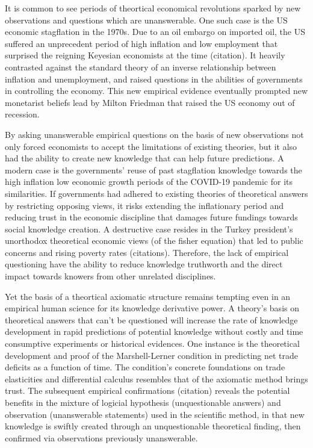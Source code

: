 \documentclass[a4paper,12pt]{article}
\begin{document}
It is common to see periods of theortical economical revolutions sparked by new observations and questions which are unanswerable. One such case is the US economic stagflation in the 1970s. Due to an oil embargo on imported oil, the US suffered an unprecedent period of high inflation and low employment that surprised the reigning Keyesian economists at the time (citation). It heavily contrasted against the standard theory of an inverse relationship between inflation and unemployment, and raised questions in the abilities of governments in controlling the economy. This new empirical evidence eventually prompted new monetarist beliefs lead by Milton Friedman that raised the US economy out of recession.

By asking unanswerable empirical questions on the basis of new observations not only forced economists to 
accept the limitations of existing theories, but it also had the ability to create new knowledge that can help future predictions. A modern case is the governments' reuse of past stagflation knowledge towards the high inflation low economic growth periods of the COVID-19 pandemic for its similarities. If governments had adhered to existing theories of theoretical answers by restricting opposing views, it risks extending the inflationary period and reducing trust in the economic discipline that damages future fundings towards social knowledge creation. A destructive case resides in the Turkey president's unorthodox theoretical economic views (of the fisher equation) that led to public concerns and rising poverty rates (citations). Therefore, the lack of empirical questioning have the ability to reduce knowledge truthworth and the direct impact towards knowers from other unrelated disciplines.

Yet the basis of a theortical axiomatic structure remains tempting even in an empirical human science for its knowledge derivative power. A theory's basis on theoretical answers that can't be questioned will increase the rate of knowledge development in rapid predictions of potential knowledge without costly and time consumptive experiments or historical evidences. One instance is the theoretical development and proof of the Marshell-Lerner condition in predicting net trade deficits as a function of time. The condition's concrete foundations on trade elasticities and differential calculus resembles that of the axiomatic method brings trust. The subsequent empirical confirmations (citation) reveals the potential benefits in the mixture of logicial hypothesis (unquestionable answers) and observation (unanswerable statements) used in the scientific method, in that new knowledge is swiftly created through an unquestionable theoretical finding, then confirmed via observations previously unanswerable.
\end{document}
